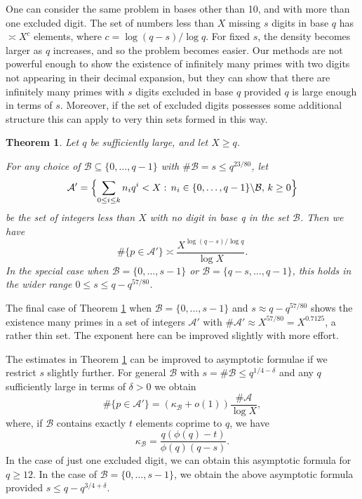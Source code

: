 \documentclass[10pt]{amsart}
\theoremstyle{plain}
\newtheorem{thrm}{Theorem}[section]
\numberwithin{sblmm}{thrm}
\numberwithin{equation}{section}
\begin{document}
One can consider the same problem in bases other than 10, and with more than one excluded digit. The set of numbers less than $X$ missing $s$ digits in base $q$ has $\asymp X^{c}$ elements, where $c=\log(q-s)/\log{q}$. For fixed $s$, the density becomes larger as $q$ increases, and so the problem becomes easier. Our methods are not powerful enough to show the existence of infinitely many primes with two digits not appearing in their decimal expansion, but they can show that there are infinitely many primes with $s$ digits excluded in base $q$ provided $q$ is large enough in terms of $s$. Moreover, if the set of excluded digits possesses some additional structure this can apply to very thin sets formed in this way.
%
%
%
%
\begin{thrm}\label{thrm:ManyDigits}
%
Let $q$ be sufficiently large, and let $X\ge q$.

For any choice of $\mathcal{B}\subseteq\{0,\dots,q-1\}$ with $\#\mathcal{B}=s\le q^{23/80}$, let 
\[
\mathcal{A}'=\Bigl\{\sum_{0\le i \le k}n_i q^i< X:\,n_i\in\{0,\dots,q-1\}\backslash\mathcal{B},\,k\ge 0\Bigr\}
\]
 be the set of integers less than $X$ with no digit in base q in the set $\mathcal{B}$. Then we have
\[
\#\{p\in\mathcal{A}'\}\asymp \frac{X^{\log(q-s)/\log{q}}}{\log{X}}.
\]
In the special case when $\mathcal{B}=\{0,\dots,s-1\}$ or $\mathcal{B}=\{q-s,\dots,q-1\}$, this holds in the wider range $0\le s\le q-q^{57/80}$.
%
\end{thrm}
%
%
%
%
The final case of Theorem \ref{thrm:ManyDigits} when $\mathcal{B}=\{0,\dots,s-1\}$ and $s\approx q-q^{57/80}$ shows the existence many primes in a set of integers $\mathcal{A}'$ with $\#\mathcal{A}'\approx X^{57/80}=X^{0.7125}$, a rather thin set. The exponent here can be improved slightly with more effort.

The estimates in Theorem \ref{thrm:ManyDigits} can be improved to asymptotic formulae if we restrict $s$ slightly further. For general $\mathcal{B}$ with $s=\#\mathcal{B}\le q^{1/4-\delta}$ and any $q$ sufficiently large in terms of $\delta>0$ we obtain
\[
\#\{p\in\mathcal{A}'\}=(\kappa_\mathcal{B}+o(1))\frac{\#\mathcal{A}}{\log{X}},
\]
where, if $\mathcal{B}$ contains exactly $t$ elements coprime to $q$, we have
\[
\kappa_\mathcal{B}=
%
%
\frac{q(\phi(q)-t)}{\phi(q)(q-s)}.%
%
\]
In the case of just one excluded digit, we can obtain this asymptotic formula for $q\ge 12$. In the case of $\mathcal{B}=\{0,\dots,s-1\}$, we obtain the above asymptotic formula provided $s\le q-q^{3/4+\delta}$.
\end{document}
